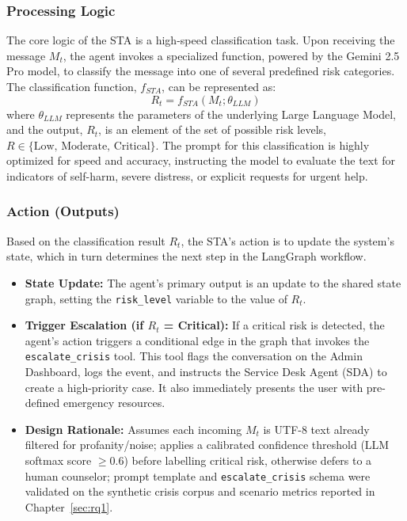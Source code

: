 \subsubsection{Processing Logic}
The core logic of the STA is a high-speed classification task. Upon receiving the message $M_t$, the agent invokes a specialized function, powered by the Gemini 2.5 Pro model, to classify the message into one of several predefined risk categories. The classification function, $f_{STA}$, can be represented as:
$$ R_t = f_{STA}(M_t; \theta_{LLM}) $$
where $\theta_{LLM}$ represents the parameters of the underlying Large Language Model, and the output, $R_t$, is an element of the set of possible risk levels, $R \in \{\text{Low, Moderate, Critical}\}$. The prompt for this classification is highly optimized for speed and accuracy, instructing the model to evaluate the text for indicators of self-harm, severe distress, or explicit requests for urgent help.

\subsubsection{Action (Outputs)}
Based on the classification result $R_t$, the STA's action is to update the system's state, which in turn determines the next step in the LangGraph workflow.
\begin{itemize}
    \item \textbf{State Update:} The agent's primary output is an update to the shared state graph, setting the \texttt{risk\_level} variable to the value of $R_t$.
    \item \textbf{Trigger Escalation (if $R_t$ = Critical):} If a critical risk is detected, the agent's action triggers a conditional edge in the graph that invokes the \texttt{escalate\_crisis} tool. This tool flags the conversation on the Admin Dashboard, logs the event, and instructs the Service Desk Agent (SDA) to create a high-priority case. It also immediately presents the user with pre-defined emergency resources.
\end{itemize}

\begin{itemize}
    \item \textbf{Design Rationale:} Assumes each incoming $M_t$ is UTF-8 text already filtered for profanity/noise; applies a calibrated confidence threshold (LLM softmax score $\geq0.6$) before labelling critical risk, otherwise defers to a human counselor; prompt template and \texttt{escalate\_crisis} schema were validated on the synthetic crisis corpus and scenario metrics reported in Chapter~\ref{sec:rq1}.\cite{FIND_CITATION_PLACEHOLDER}
\end{itemize}


